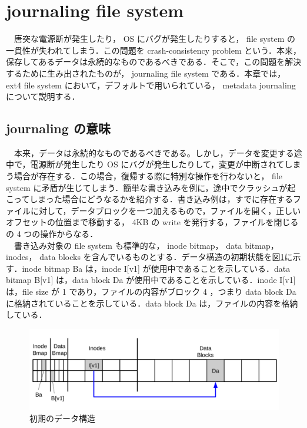 \documentclass[graduation-thesis]{jsarticle}
\begin{document}
\section{journaling file system}
\label{sec:journaling}
　唐突な電源断が発生したり， OS にバグが発生したりすると， file system の一貫性が失われてしまう．この問題を crash-consistency problem という．本来，保存してあるデータは永続的なものであるべきである．そこで，この問題を解決するために生み出されたものが， journaling file system である．本章では， ext4 file system において，デフォルトで用いられている， metadata journaling について説明する．
\subsection{journaling の意味}
　本来，データは永続的なものであるべきである。しかし，データを変更する途中で，電源断が発生したり OS にバグが発生したりして，変更が中断されてしまう場合が存在する．この場合，復帰する際に特別な操作を行わないと， file system に矛盾が生じてしまう．簡単な書き込みを例に，途中でクラッシュが起こってしまった場合にどうなるかを紹介する．書き込み例は，すでに存在するファイルに対して，データブロックを一つ加えるもので，ファイルを開く，正しいオフセットの位置まで移動する， 4KB の write を発行する，ファイルを閉じるの 4 つの操作からなる．\\
　書き込み対象の file system も標準的な， inode bitmap， data bitmap， inodes， data blocks を含んでいるものとする．データ構造の初期状態を図\ref{fig:data1}に示す．inode bitmap Ba は，inode I[v1] が使用中であることを示している．data bitmap B[v1] は，data block Da が使用中であることを示している．inode I[v1] は，file size が 1 であり，ファイルの内容がブロック 4 ，つまり data block Da に格納されていることを示している．data block Da は，ファイルの内容を格納している．\\
\begin{figure}[H]
	\begin{center}
		\includegraphics[width=15.0cm,clip]{images/data1.pdf}
		\caption{初期のデータ構造}
		\label{fig:data1}
	\end{center}
\end{figure}
\end{document}
